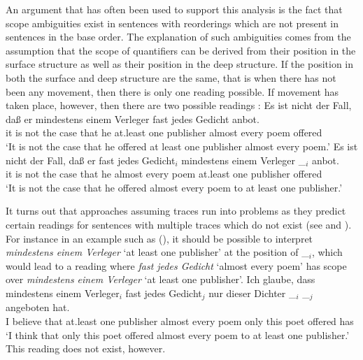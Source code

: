%
An argument that has often been used to support this analysis is the fact that scope ambiguities
exist in sentences with reorderings which are not present in sentences in the base order. The explanation of such ambiguities comes from the assumption that the scope of quantifiers
can be derived from their position in the surface structure as well as their position in the deep structure. If the position in both the surface
and deep structure are the same, that is when there has not been any movement, then there is only one reading possible. If movement has taken place,
however, then there are two possible readings \citep[\page ]{Frey93a}:
\eal
\ex 
\gll Es ist nicht der Fall, daß er mindestens einem Verleger fast jedes Gedicht anbot.\\
     it is not the case that he at.least one publisher almost every poem offered\\
\glt `It is not the case that he offered at least one publisher almost every poem.'
\ex 
\gll Es ist nicht der Fall, daß er fast jedes Gedicht$_i$ mindestens einem Verleger \_$_i$ anbot.\\
	 it is not the case that he almost every poem at.least one publisher {} offered\\
\glt `It is not the case that he offered almost every poem to at least one publisher.'
\zl

\noindent
It turns out that approaches assuming traces run into problems as they predict certain readings for sentences with multiple traces which
do not exist (see \citealp[]{Kiss2001a} and \citealp[Section~2.6]{Fanselow2001a}). 
For instance in an example such as (), it should be possible to interpret \emph{mindestens einem Verleger} `at least one publisher' at
the position of \_$_i$, which would lead to a reading where \emph{fast jedes Gedicht} `almost every poem' has scope over \emph{mindestens einem Verleger} 
`at least one publisher'.
\ea
\gll Ich glaube, dass mindestens einem Verleger$_i$ fast jedes Gedicht$_j$ nur dieser Dichter \_$_i$ \_$_j$ angeboten hat.\\
	 I believe that at.least one publisher almost every poem only this poet {} {} offered has\\
\glt `I think that only this poet offered almost every poem to at least one publisher.'
\z
This reading does not exist, however.


